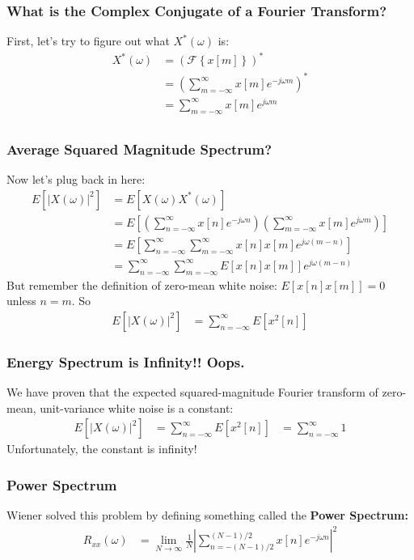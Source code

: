 \documentclass{beamer}
\begin{document}
\begin{frame}
  \frametitle{What is the Complex Conjugate of a Fourier Transform?}

  First, let's try to figure out what $X^*(\omega)$ is:
  \begin{align*}
    X^*(\omega) &= \left({\mathcal F}\left\{x[m]\right\}\right)^*\\
    &= \left(\sum_{m=-\infty}^\infty x[m]e^{-j\omega m}\right)^*\\
    &= \sum_{m=-\infty}^\infty x[m]e^{j\omega m}\\
  \end{align*}
\end{frame}

\begin{frame}
  \frametitle{Average Squared Magnitude Spectrum?}

  Now let's plug back in here:
  \begin{align*}
    E\left[|X(\omega)|^2\right] &=  E\left[X(\omega)X^*(\omega)\right]\\
    &= E\left[\left(\sum_{n=-\infty}^\infty x[n]e^{-j\omega n}\right)
      \left(\sum_{m=-\infty}^\infty x[m]e^{j\omega m}\right)\right]\\
    &= E\left[\sum_{n=-\infty}^\infty\sum_{m=-\infty}^\infty x[n]x[m]e^{j\omega(m-n)}\right]\\
    &= \sum_{n=-\infty}^\infty\sum_{m=-\infty}^\infty E\left[x[n]x[m]\right]e^{j\omega(m-n)}
  \end{align*}
  But remember the definition of zero-mean white noise: $E\left[x[n]x[m]\right]=0$ unless $n=m$.
  So
  \begin{align*}
    E\left[|X(\omega)|^2\right] &=  \sum_{n=-\infty}^\infty E\left[x^2[n]\right]
  \end{align*}
\end{frame}

\begin{frame}
  \frametitle{Energy Spectrum is Infinity!!  Oops.}

  We have proven that the expected squared-magnitude Fourier transform
  of zero-mean, unit-variance white noise is a constant:
  \begin{align*}
    E\left[|X(\omega)|^2\right] &=  \sum_{n=-\infty}^\infty E\left[x^2[n]\right]
    &=  \sum_{n=-\infty}^\infty 1
  \end{align*}
  Unfortunately, the constant is infinity!
\end{frame}
\begin{frame}
  \frametitle{Power Spectrum}
  
  Wiener solved this problem
  by defining something called the {\bf Power Spectrum:}
  \begin{align*}
    R_{xx}(\omega)  &= \lim_{N\rightarrow\infty} \frac{1}{N}\left|\sum_{n=-(N-1)/2}^{(N-1)/2} x[n]e^{-j\omega n}\right|^2
  \end{align*}
\end{frame}
\end{document}
